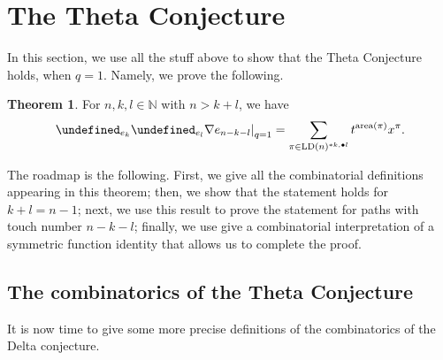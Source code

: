 \documentclass[reqno]{amsart}
\theoremstyle{plain}
\theoremstyle{definition}
\newtheorem{theorem}{Theorem}[section]
\theoremstyle{remark}
\DeclareMathOperator{\LD}{LD}
\DeclareMathOperator{\area}{area}
\let\oldTheta\Theta
\let\Theta\undefined
\DeclareMathOperator{\Theta}{\oldTheta}
\newcommand{\<}{\langle}
\renewcommand{\>}{\rangle}
\begin{document}
\section{The Theta Conjecture}
\label{sec:theta_conjecture}

In this section, we use all the stuff above to show that the Theta Conjecture \cite[Conjecture~9.1]{DAdderioIraciVandenWyngaerd2021ThetaOperators} holds, when $q=1$. Namely, we prove the following.

\begin{theorem}
    \label{thm:theta_q1}
    For $n,k,l \in \mathbb{N}$ with $n > k+l$, we have
    \[ \left.\Theta_{e_k} \Theta_{e_l} \nabla e_{n-k-l} \right|_{q=1} = \sum_{\pi \in \LD(n)^{\ast k, \bullet l}} t^{\area(\pi)} x^\pi. \]
\end{theorem}

The roadmap is the following. First, we give all the combinatorial definitions appearing in this theorem; then, we show that the statement holds for $k+l=n-1$; next, we use this result to prove the statement for paths with touch number $n-k-l$; finally, we use give a combinatorial interpretation of a symmetric function identity that allows us to complete the proof.


\subsection{The combinatorics of the Theta Conjecture}

It is now time to give some more precise definitions of the combinatorics of the Delta conjecture.
\end{document}
